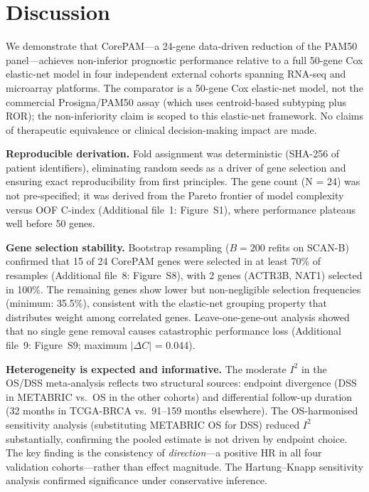 \documentclass[referee,lineno,pdflatex,sn-vancouver-num]{sn-jnl}
\begin{document}
\section{Discussion}\label{sec:discussion}

We demonstrate that CorePAM---a 24-gene data-driven reduction of the PAM50 panel---achieves non-inferior prognostic performance relative to a full 50-gene Cox elastic-net model in four independent external cohorts spanning RNA-seq and microarray platforms. The comparator is a 50-gene Cox elastic-net model, not the commercial Prosigna/PAM50 assay (which uses centroid-based subtyping plus ROR); the non-inferiority claim is scoped to this elastic-net framework. No claims of therapeutic equivalence or clinical decision-making impact are made.

\textbf{Reproducible derivation.} Fold assignment was deterministic (SHA-256 of patient identifiers), eliminating random seeds as a driver of gene selection and ensuring exact reproducibility from first principles. The gene count (N = 24) was not pre-specified; it was derived from the Pareto frontier of model complexity versus OOF C-index (Additional file~1: Figure~S1), where performance plateaus well before 50 genes.

\textbf{Gene selection stability.} Bootstrap resampling ($B = 200$ refits on SCAN-B) confirmed that 15 of 24 CorePAM genes were selected in at least 70\% of resamples (Additional file~8: Figure~S8), with 2 genes (ACTR3B, NAT1) selected in 100\%. The remaining genes show lower but non-negligible selection frequencies (minimum: 35.5\%), consistent with the elastic-net grouping property that distributes weight among correlated genes. Leave-one-gene-out analysis showed that no single gene removal causes catastrophic performance loss (Additional file~9: Figure~S9; maximum $|\Delta C|$ = 0.044).

\textbf{Heterogeneity is expected and informative.} The moderate $I^2$ in the OS/DSS meta-analysis reflects two structural sources: endpoint divergence (DSS in METABRIC vs.\ OS in the other cohorts) and differential follow-up duration (32 months in TCGA-BRCA vs.\ 91--159 months elsewhere). The OS-harmonised sensitivity analysis (substituting METABRIC OS for DSS) reduced $I^2$ substantially, confirming the pooled estimate is not driven by endpoint choice. The key finding is the consistency of \textit{direction}---a positive HR in all four validation cohorts---rather than effect magnitude. The Hartung--Knapp sensitivity analysis confirmed significance under conservative inference.
\end{document}
